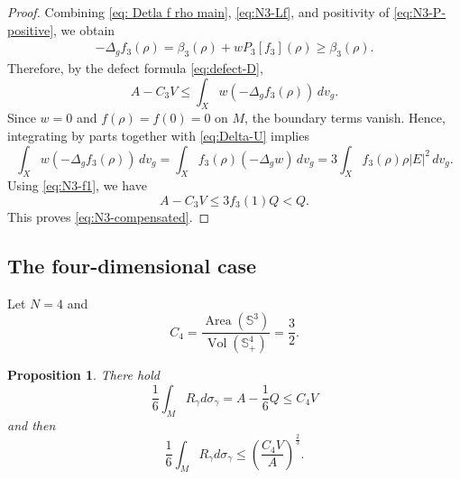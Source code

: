 \documentclass[11pt,letterpaper]{amsart}
\newtheorem{proposition}[theorem]{Proposition}
\theoremstyle{definition}
\theoremstyle{remark}
\numberwithin{equation}{section}
\newcommand{\Sph}{\mathbb S}
\newcommand{\vol}{\operatorname{Vol}}
\newcommand{\area}{\operatorname{Area}}
\begin{document}
\begin{proof}
Combining \eqref{eq: Detla f rho main}, \eqref{eq:N3-Lf}, and positivity of \eqref{eq:N3-P-positive}, we obtain
\begin{align*}
 -\Delta_g f_3(\rho)=\beta_3(\rho)+wP_3[f_3](\rho)\ge\beta_3(\rho).
\end{align*}
Therefore, by the defect formula \eqref{eq:defect-D},
\[
 A-C_3V\le\int_Xw(-\Delta_gf_3(\rho))\,dv_g.
\]
Since $w=0$ and $f(\rho)=f(0)=0$ on $M$, the boundary terms vanish. Hence, integrating by parts together with \eqref{eq:Delta-U} implies
\[
 \int_Xw(-\Delta_gf_3(\rho))\,dv_g
 =\int_Xf_3(\rho)(-\Delta_gw)\,dv_g
 =3\int_Xf_3(\rho)\rho |E|^2\,dv_g.
\]
Using \eqref{eq:N3-f1}, we have
\[
 A-C_3V\le3f_3(1)Q<Q.
\]
This proves \eqref{eq:N3-compensated}. 
\end{proof}
\subsection{The four-dimensional case}
Let $N=4$ and
\[
 C_4=\frac{\area(\Sph^3)}{\vol(\Sph^4_+)}=\frac32.
\]
\begin{proposition}\label{lem:N4-compensated}
There hold
\begin{equation}\label{eq:N4-compensated}
 \frac{1}{6} \int_M R_\gamma d \sigma_\gamma=A-\frac{1}{6} Q \leq C_4 V
\end{equation}
and then
\begin{equation}\label{eq:N4-compensated-new}
\frac{1}{6} \int_M R_\gamma d \sigma_\gamma  \leq \left (\frac{C_4 V}{A}\right)^{\frac{2}{3}}.
\end{equation}
\end{proposition}
\end{document}
